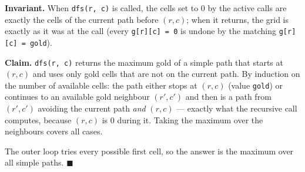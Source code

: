 \begin{invariantbox}
\textbf{Invariant.} When \texttt{dfs(r, c)} is called, the cells set to 0 by the active calls are exactly the cells of the current path before $(r,c)$; when it returns, the grid is exactly as it was at the call (every \texttt{g[r][c] = 0} is undone by the matching \texttt{g[r][c] = gold}).

\textbf{Claim.} \texttt{dfs(r, c)} returns the maximum gold of a simple path that starts at $(r,c)$ and uses only gold cells that are not on the current path. By induction on the number of available cells: the path either stops at $(r,c)$ (value \texttt{gold}) or continues to an available gold neighbour $(r', c')$ and then is a path from $(r', c')$ avoiding the current path \emph{and} $(r,c)$ --- exactly what the recursive call computes, because $(r,c)$ is 0 during it. Taking the maximum over the neighbours covers all cases.

The outer loop tries every possible first cell, so the answer is the maximum over all simple paths. \hfill$\blacksquare$
\end{invariantbox}

